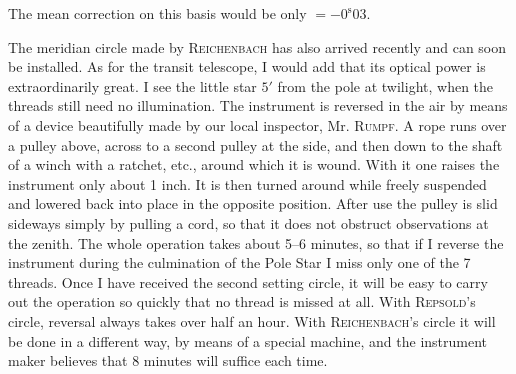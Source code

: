 The mean correction on this basis would be only $= -0^{\mathrm s}03$.

\par\indent The meridian circle made by \textsc{Reichenbach} has also arrived recently and can soon be installed. As for the transit telescope, I would add that its optical power is extraordinarily great. I see the little star $5'$ from the pole at twilight, when the threads still need no illumination. The instrument is reversed in the air by means of a device beautifully made by our local inspector, Mr. \textsc{Rumpf}. A rope runs over a pulley above, across to a second pulley at the side, and then down to the shaft of a winch with a ratchet, etc., around which it is wound. With it one raises the instrument only about 1 inch. It is then turned around while freely suspended and lowered back into place in the opposite position. After use the pulley is slid sideways simply by pulling a cord, so that it does not obstruct observations at the zenith. The whole operation takes about 5--6 minutes, so that if I reverse the instrument during the culmination of the Pole Star I miss only one of the 7 threads. Once I have received the second setting circle, it will be easy to carry out the operation so quickly that no thread is missed at all. With \textsc{Repsold}’s circle, reversal always takes over half an hour. With \textsc{Reichenbach}’s circle it will be done in a different way, by means of a special machine, and the instrument maker believes that 8 minutes will suffice each time.
